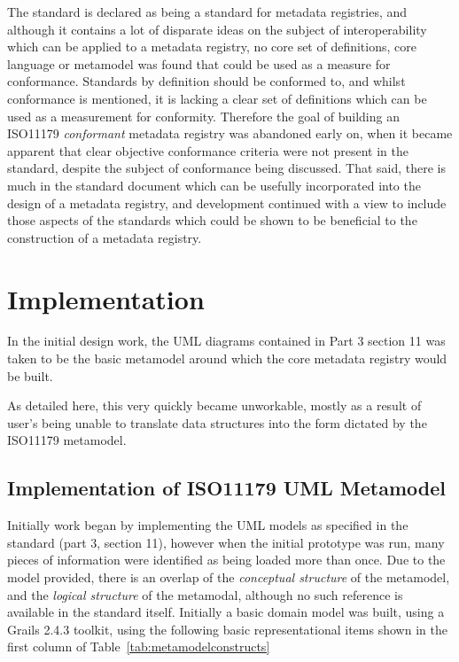 \documentclass[runningheads]{llncs}
\begin{document}
	The standard is declared as being a standard for metadata registries, and although it contains a lot of disparate ideas on the subject of interoperability which can be applied to a metadata registry, no core set of definitions, core language or metamodel was found that could be used as a measure for conformance.  Standards by definition should be conformed to, and whilst conformance is mentioned, it is lacking a clear set of definitions which can be used as a measurement for conformity.  Therefore the goal of building an ISO11179 \emph{conformant} metadata registry was abandoned early on, when it became apparent that clear objective conformance criteria were not present in the standard, despite the subject of conformance being discussed. That said, there is much in the standard document which can be usefully incorporated into the design of a metadata registry, and development continued with a view to include those aspects of the standards which could be shown to be beneficial to the construction of a metadata registry. 
	
	\section{Implementation}
	In the initial design work, the UML diagrams contained in Part 3 section 11 was taken to be the basic metamodel around which the core metadata registry would be built.
	
	As detailed here, this very quickly became unworkable, mostly as a result of user's being unable to translate data structures into the form dictated by the ISO11179 metamodel.
	
	\subsection{Implementation of ISO11179  UML Metamodel}
	
	Initially work began by implementing the UML models as specified in the standard (part 3, section 11), however when the initial prototype was run, many pieces of information were identified as being loaded more than once. Due to the model provided, there is an overlap of the \emph{conceptual structure} of the metamodel, and the \emph{logical structure} of the metamodal, although no such reference is available in the standard itself. Initially a basic domain model was built, using a Grails 2.4.3 toolkit, using the following basic representational items shown in the first column of Table~\ref{tab:metamodelconstructs}
	
\end{document}
